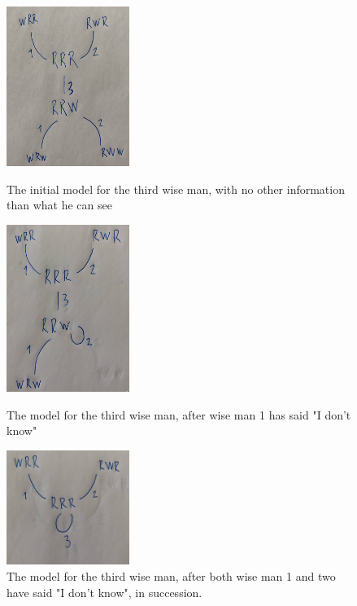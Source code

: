 \begin{figure}
	\begin{minipage}[c]{3cm}
\includegraphics[width=4cm]{images/three_wise_men_round_0.png}
	\caption{The initial model for the third wise man, with no other information than what he can see}

	\label{fig:twm-round-0}
\end{minipage}
\hfill
	\begin{minipage}[c]{3cm}
	\includegraphics[width=4cm]{images/three_wise_men_round_1.png}
	\caption{The model for the third wise man, after wise man 1 has said "I don't know"}

	\label{fig:twm-round-1}
\end{minipage}
\hfill
	\begin{minipage}[c]{3cm}
	\includegraphics[width=4cm]{images/three_wise_men_round_2.png}
	\caption{The model for the third wise man, after both wise man 1 and two have said "I don't know", in succession.}

	\label{fig:twm-round-2}
\end{minipage}
\end{figure}



